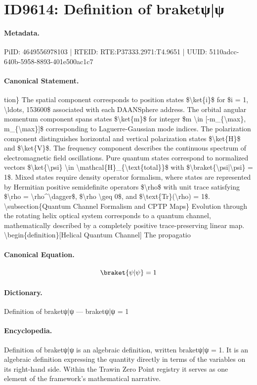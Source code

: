 \section*{ID9614: Definition of braketψ|ψ}
\paragraph{Metadata.}
PiID: 4649556978103 | RTEID: RTE:P37333.2971:T4.9651 | UUID: 5110adcc-640b-5958-8893-401e500ac1c7

\paragraph{Canonical Statement.}
tion\} The spatial component corresponds to position states \$\textbackslash{}ket\{i\}\$ for \$i = 1, \textbackslash{}ldots, 153600\$ associated with each DAANSphere address. The orbital angular momentum component spans states \$\textbackslash{}ket\{m\}\$ for integer \$m \textbackslash{}in [-m\_\{\textbackslash{}max\}, m\_\{\textbackslash{}max\}]\$ corresponding to Laguerre-Gaussian mode indices. The polarization component distinguishes horizontal and vertical polarization states \$\textbackslash{}ket\{H\}\$ and \$\textbackslash{}ket\{V\}\$. The frequency component describes the continuous spectrum of electromagnetic field oscillations. Pure quantum states correspond to normalized vectors \$\textbackslash{}ket\{\textbackslash{}psi\} \textbackslash{}in \textbackslash{}mathcal\{H\}\_\{\textbackslash{}text\{total\}\}\$ with \$\textbackslash{}braket\{\textbackslash{}psi|\textbackslash{}psi\} = 1\$. Mixed states require density operator formalism, where states are represented by Hermitian positive semidefinite operators \$\textbackslash{}rho\$ with unit trace satisfying \$\textbackslash{}rho = \textbackslash{}rho\textasciicircum{}\textbackslash{}dagger\$, \$\textbackslash{}rho \textbackslash{}geq 0\$, and \$\textbackslash{}text\{Tr\}(\textbackslash{}rho) = 1\$. \textbackslash{}subsection\{Quantum Channel Formalism and CPTP Maps\} Evolution through the rotating helix optical system corresponds to a quantum channel, mathematically described by a completely positive trace-preserving linear map. \textbackslash{}begin\{definition\}[Helical Quantum Channel] The propagatio

\paragraph{Canonical Equation.}
\[
\braket{\psi|\psi} = 1
\]

\paragraph{Dictionary.}
Definition of braketψ|ψ — braketψ|ψ = 1

\paragraph{Encyclopedia.}
Definition of braketψ|ψ is an algebraic definition, written braketψ|ψ = 1. It is an algebraic definition expressing the quantity directly in terms of the variables on its right-hand side. Within the Trawin Zero Point registry it serves as one element of the framework's mathematical narrative.
